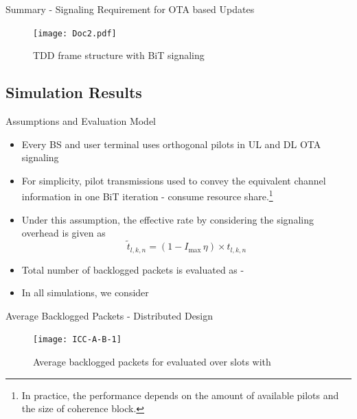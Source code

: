 \documentclass[9pt]{beamer}
\let\oldfootnote\footnote
\renewcommand\footnote[1][]{\oldfootnote[frame,#1]}
\begin{document}
\begin{frame}{Summary - Signaling Requirement for OTA based Updates}
\begin{figure}
	\centering
	\texttt{[image: Doc2.pdf]}
	\caption{\ac{TDD} frame structure with \ac{BiT} signaling}
	\label{fig-a}
\end{figure}
\end{frame}

\subsection{Simulation Results}

\begin{frame}{Assumptions and Evaluation Model}
	\begin{itemize}
		\item Every \ac{BS} and user terminal uses \textcolor[rgb]{0,0.6,0}{orthogonal pilots in UL and DL \ac{OTA} signaling}
		\item For simplicity, pilot transmissions used to convey the equivalent channel information in one \ac{BiT} iteration - \textcolor[rgb]{0,0,0.6}{consume \eqn{\eta} resource share}.\footnote{In practice, the performance depends on the amount of available pilots and the size of coherence block.}
		\item Under this assumption, the effective rate by considering the signaling overhead is given as
		\begin{equation} \label{penalty}
		\tilde{t}_{l,k,n} = \left ( 1 - I_{\max} \, \eta \right ) \times t_{l,k,n}
		\end{equation}
		\item Total number of backlogged packets is evaluated as - 
		\item In all simulations, \textcolor[rgb]{0.6,0,0}{we consider }
	\end{itemize}	
\end{frame}

\begin{frame}{Average Backlogged Packets - Distributed Design}
	\begin{figure}
		\centering
		\texttt{[image: ICC-A-B-1]}
		\caption{Average backlogged packets for  evaluated over  slots with }
		\label{fig-1}
	\end{figure}
\end{frame}
\end{document}
